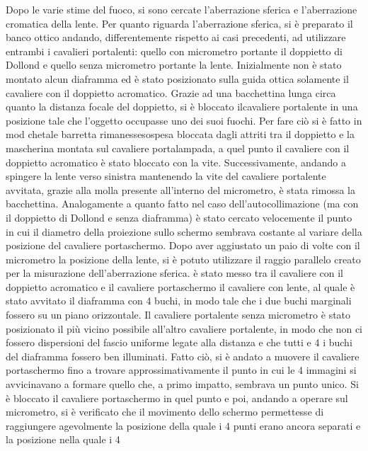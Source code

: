 Dopo le varie stime del fuoco, si sono cercate l'aberrazione sferica 
e l'aberrazione cromatica della lente. Per quanto riguarda 
l'aberrazione sferica, si è preparato il banco ottico andando, 
differentemente rispetto ai casi precedenti, ad utilizzare entrambi 
i cavalieri portalenti: quello con micrometro portante il doppietto 
di Dollond e quello senza micrometro portante la lente. Inizialmente 
non è stato montato alcun diaframma ed è stato posizionato sulla 
guida ottica solamente il cavaliere con il doppietto acromatico. 
Grazie ad una bacchettina lunga circa quanto la distanza focale del 
doppietto, si è bloccato ilcavaliere portalente in una posizione 
tale che l'oggetto occupasse uno dei suoi fuochi. Per fare ciò si è 
fatto in mod chetale barretta rimanessesospesa bloccata dagli 
attriti tra il doppietto e la mascherina montata sul cavaliere 
portalampada, a quel punto il cavaliere con il doppietto acromatico 
è stato bloccato con la vite. Successivamente, andando a spingere la 
lente verso sinistra mantenendo la vite del cavaliere portalente 
avvitata, grazie alla molla presente all'interno del micrometro, è 
stata rimossa la bacchettina. Analogamente a quanto fatto nel caso 
dell'autocollimazione (ma con il doppietto di Dollond e senza 
diaframma) è stato cercato velocemente il punto in cui il diametro 
della proiezione sullo schermo sembrava costante al variare della 
posizione del cavaliere portaschermo. Dopo aver aggiustato un paio 
di volte con il micrometro la posizione della lente, si è potuto 
utilizzare il raggio parallelo creato per la misurazione 
dell'aberrazione sferica. è stato messo tra il cavaliere con il 
doppietto acromatico e il cavaliere portaschermo il cavaliere con 
lente, al quale è stato avvitato il diaframma con 4 buchi, in modo 
tale che i due buchi marginali fossero su un piano orizzontale. Il 
cavaliere portalente senza micrometro è stato posizionato il più 
vicino possibile all'altro cavaliere portalente, in modo che non ci 
fossero dispersioni del fascio uniforme legate alla distanza e che 
tutti e 4 i buchi del diaframma fossero ben illuminati. Fatto ciò, si 
è andato a muovere il cavaliere portaschermo fino a trovare 
approssimativamente il punto in cui le 4 immagini si avvicinavano a 
formare quello che, a primo impatto, sembrava un punto unico. Si è 
bloccato il cavaliere portaschermo in quel punto e poi, andando a 
operare sul micrometro, si è verificato che il movimento dello 
schermo permettesse di raggiungere agevolmente la posizione della 
quale i 4 punti erano ancora separati e la posizione nella quale i 4 
